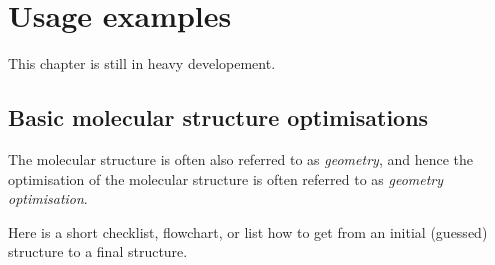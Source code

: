 \documentclass[   %
  final,          %
  a4paper         %
]{article}
\begin{document}
\section{Usage examples}
\label{sec:usage-examples}

This chapter is still in heavy developement.

\subsection{Basic molecular structure optimisations}

The molecular structure is often also referred to as \emph{geometry},
and hence the optimisation of the molecular structure is often referred
to as \emph{geometry optimisation}.

Here is a short checklist, flowchart, or list how to get from an initial
(guessed) structure to a final structure.
\end{document}
